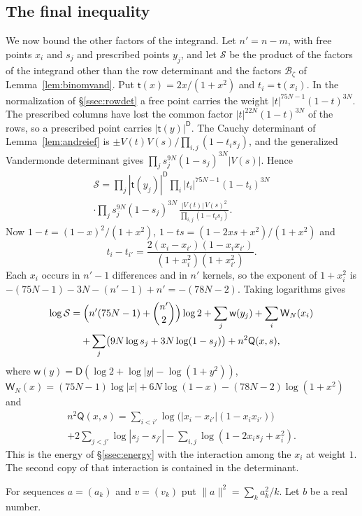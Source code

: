 \documentclass[11pt]{amsart}
\theoremstyle{definition}
\theoremstyle{remark}
\numberwithin{equation}{section}
\begin{document}
\subsection{The final inequality}\label{ssec:budget}
We now bound the other factors of the integrand. Let $n'=n-m$, with free points $x_i$ and $s_j$ and prescribed points $y_j$, and let $\mathcal S$ be the product of the
factors of the integrand other than the row determinant and the factors $\mathcal B_\zeta$ of Lemma~\ref{lem:binomvand}. Put $\mathsf t(x)=2x/(1+x^2)$ and $t_i=\mathsf t(x_i)$. In the normalization of
\S\ref{ssec:rowdet} a free point carries the weight $|t|^{75N-1}(1-t)^{3N}$. The prescribed columns have lost the common factor $|t|^{22N}(1-t)^{3N}$ of the rows, so a prescribed point
carries $|\mathsf t(y)|^{\mathsf D}$. The Cauchy determinant of Lemma~\ref{lem:andreief} is $\pm V(t)V(s)/\prod_{i,j}(1-t_is_j)$, and the generalized Vandermonde determinant gives
$\prod_js_j^{9N}(1-s_j)^{3N}|V(s)|$. Hence
\begin{multline*}
 \mathcal S=\prod_j|\mathsf t(y_j)|^{\mathsf D}\prod_i|t_i|^{75N-1}(1-t_i)^{3N}\\
 \cdot\prod_js_j^{9N}(1-s_j)^{3N}\,\frac{|V(t)|\,V(s)^2}{\prod_{i,j}(1-t_is_j)}.
\end{multline*}
Now $1-t=(1-x)^2/(1+x^2)$, $1-ts=(1-2xs+x^2)/(1+x^2)$ and
\[
 t_i-t_{i'}=\frac{2(x_i-x_{i'})(1-x_ix_{i'})}{(1+x_i^2)(1+x_{i'}^2)}.
\]
Each $x_i$ occurs in $n'-1$ differences and in $n'$ kernels, so the exponent of $1+x_i^2$ is $-(75N-1)-3N-(n'-1)+n'=-(78N-2)$. Taking logarithms gives
\begin{multline}\label{eq:scalar}
 \log\mathcal S=\Bigl(n'(75N-1)+\binom{n'}2\Bigr)\log2+\sum_j\mathsf w(y_j)+\sum_i\mathsf W_N(x_i)\\
 +\sum_j\bigl(9N\log s_j+3N\log(1-s_j)\bigr)+n^2\mathsf Q(x,s),
\end{multline}
where $\mathsf w(y)=\mathsf D(\log2+\log|y|-\log(1+y^2))$, $\mathsf W_N(x)=(75N-1)\log|x|+6N\log(1-x)-(78N-2)\log(1+x^2)$ and
\begin{multline*}
 n^2\mathsf Q(x,s)=\sum_{i<i'}\log\bigl(|x_i-x_{i'}|(1-x_ix_{i'})\bigr)\\
 +2\sum_{j<j'}\log|s_j-s_{j'}|-\sum_{i,j}\log(1-2x_is_j+x_i^2).
\end{multline*}
This is the energy of \S\ref{ssec:energy} with the interaction among the $x_i$ at weight $1$. The second copy of that interaction is
contained in the determinant.

For sequences $a=(a_k)$ and $v=(v_k)$ put $\|a\|^2=\sum_ka_k^2/k$. Let $b$ be a real number.
\end{document}
